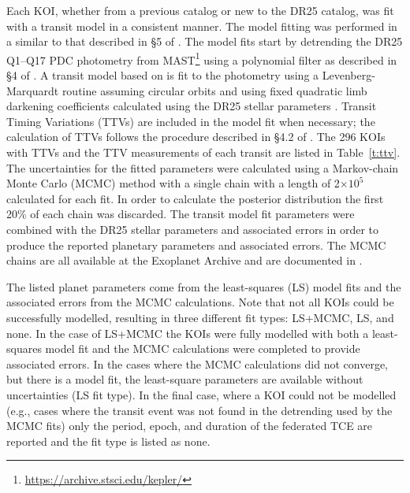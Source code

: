 \label{s:mcmc}

Each KOI, whether from a previous catalog or new to the DR25 catalog, was fit with a transit model in a consistent manner. The model fitting was performed in a similar to that described in \S5 of \citet{Rowe2015cat}. The model fits start by detrending the DR25 Q1--Q17 PDC photometry from MAST\footnote{\url{https://archive.stsci.edu/kepler/}} using a polynomial filter as described in \S4 of \citet{Rowe2014}. A transit model based on \citet{Mandel2002} is fit to the photometry using a Levenberg-Marquardt routine \citep{More1980} assuming circular orbits and using fixed quadratic limb darkening coefficients \citep{Claret2011} calculated using the DR25 stellar parameters \citep{Mathur2017ApJS}. Transit Timing Variations (TTVs) are included in the model fit when necessary; the calculation of TTVs follows the procedure described in \S4.2 of \citet{Rowe2014}. The 296 KOIs with TTVs and the TTV measurements of each transit are listed in Table~\ref{t:ttv}. The uncertainties for the fitted parameters were calculated using a Markov-chain Monte Carlo (MCMC) method \citep{Ford2005AJ} with a single chain with a length of 2$\times 10^{5}$ calculated for each fit. In order to calculate the posterior distribution the first 20\% of each chain was discarded. The transit model fit parameters were combined with the DR25 stellar parameters and associated errors \citep{Mathur2017ApJS} in order to produce the reported planetary parameters and associated errors. The MCMC chains are all available at the Exoplanet Archive and are documented in \citet{Hoffman2017}. 

The listed planet parameters come from the least-squares (LS) model fits and the associated errors from the MCMC calculations. Note that not all KOIs could be successfully modelled, resulting in three different fit types: LS+MCMC, LS, and none. In the case of LS+MCMC the KOIs were fully modelled with both a least-squares model fit and the MCMC calculations were completed to provide associated errors. In the cases where the MCMC calculations did not converge, but there is a model fit, the least-square parameters are available without uncertainties (LS fit type). In the final case, where a KOI could not be modelled (e.g., cases where the transit event was not found in the detrending used by the MCMC fits) only the period, epoch, and duration of the federated TCE are reported and the fit type is listed as none.


